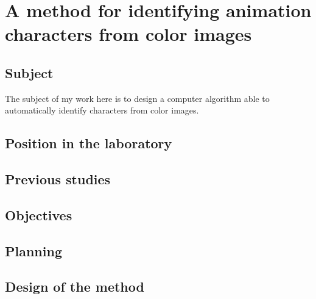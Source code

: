 \section{A method for identifying animation characters from color images}
\subsection{Subject}
The subject of my work here is to design a computer algorithm able to automatically identify characters from color images. 
\subsection{Position in the laboratory}
\subsection{Previous studies}
\subsection{Objectives}
\subsection{Planning}
\subsection{Design of the method}
